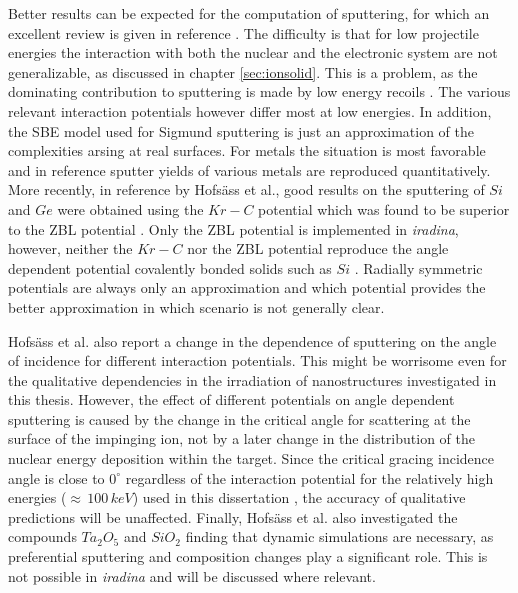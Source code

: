 Better results can be expected for the computation of sputtering, for which an excellent review is given in reference \cite{biersack_computer_1987}. The difficulty is that for low projectile energies the interaction with both the nuclear and the electronic system are not generalizable, as discussed in chapter \ref{sec:ionsolid}. This is a problem, as the dominating contribution to sputtering is made by low energy recoils \cite{thompson_energy_1968}. The various relevant interaction potentials however differ most at low energies. In addition, the SBE model used for Sigmund sputtering is just an approximation of the complexities arsing at real surfaces. For metals the situation is most favorable and in reference \cite{biersack_computer_1987} sputter yields of various metals are reproduced quantitatively. More recently, in reference \cite{hofsass_simulation_2014} by Hofsäss et al., good results on the sputtering of $Si$ and $Ge$ were obtained using the $Kr-C$ \cite{wilson_calculations_1977} potential which was found to be superior to the ZBL potential \cite{ziegler_stopping_1985}. Only the ZBL potential is implemented in \emph{iradina}, however, neither the $Kr-C$ nor the ZBL potential reproduce the angle dependent potential covalently bonded solids such as $Si$ \cite{stillinger_computer_1985,tersoff_new_1988}. Radially symmetric potentials are always only an approximation and which potential provides the better approximation in which scenario is not generally clear.

Hofsäss et al. also report a change in the dependence of sputtering on the angle of incidence for different interaction potentials. This might be worrisome even for the qualitative dependencies in the irradiation of nanostructures investigated in this thesis. However, the effect of different potentials on angle dependent sputtering is caused by the change in the critical angle for scattering at the surface of the impinging ion, not by a later change in the distribution of the nuclear energy deposition within the target. Since the critical gracing incidence angle is close to $0^\circ$ regardless of the interaction potential for the relatively high energies ($\approx\,100\,keV$) used in this dissertation \cite{yamamura_empirical_1984}, the accuracy of qualitative predictions will be unaffected. Finally, Hofsäss et al. also investigated the compounds $Ta_2O_5$ and $SiO_2$ finding that dynamic simulations are necessary, as preferential sputtering and composition changes play a significant role. This is not possible in \emph{iradina} and will be discussed where relevant.


